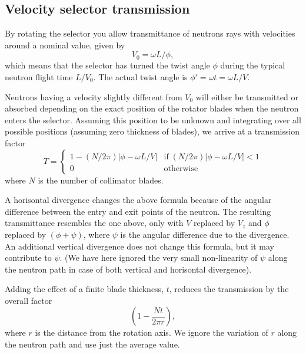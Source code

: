 \subsection{Velocity selector transmission}

By rotating the selector you allow
transmittance of neutrons rays with velocities around a nominal value, given by
\begin{equation}
V_0 = \omega L / \phi ,
\end{equation}
which means that the selector has turned the twist angle
$\phi$ during the typical neutron flight time $L/V_0$. The actual twist angle
is $\phi' = \omega t = \omega L / V$.

Neutrons having a velocity slightly different from $V_0$
will either be transmitted or absorbed depending on the exact position
of the rotator blades when the neutron enters the selector.
Assuming this position to be unknown and integrating over all possible
positions (assuming zero thickness of blades), we arrive at a transmission factor
\begin{equation}
T = \left\{
 \begin{array}{ll}
 1 - (N/2\pi ) |\phi-\omega L / V| &
        \textrm{if}\;   (N/2\pi )|\phi -\omega L / V| < 1 \\
    0  &  \textrm{otherwise}
 \end{array} \right.
\end{equation}
where $N$ is the number of collimator blades.

A horisontal divergence changes the above formula because of the
angular difference between the entry and exit points of the neutron.
The resulting transmittance resembles the one above, only with
$V$ replaced by $V_z$ and $\phi$ replaced by $(\phi +\psi )$,
where $\psi$ is the angular difference due to
the divergence. An additional vertical divergence does not change
this formula, but it may contribute to $\psi$.
(We have here ignored the very small non-linearity of $\psi$ along the
neutron path in case of both vertical and horisontal divergence).

Adding the effect of a finite blade thickness, $t$, reduces the transmission
by the overall factor
\begin{equation}
\left( 1-\frac{N t}{2\pi r}  \right),
\end{equation}
where $r$ is the distance from the rotation axis. We ignore the variation
of $r$ along the neutron path and use just the average value.


